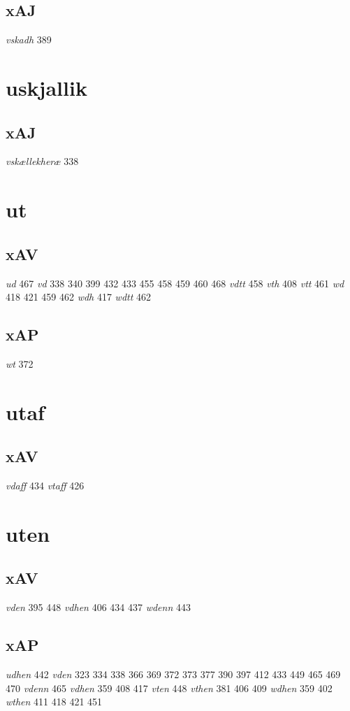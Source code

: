 \documentclass[a4paper,twocolumn]{article}
\begin{document}
\subsection{xAJ}
\label{sec:org82cc334}
\emph{vskadh} 389 
\section{uskjallik}
\label{sec:org17a98fa}
\subsection{xAJ}
\label{sec:org9221afd}
\emph{vskællekheræ} 338 
\section{ut}
\label{sec:org4f8ce6e}
\subsection{xAV}
\label{sec:org3da3f40}
\emph{ud} 467 \emph{vd} 338 340 399 432 433 455 458 459 460 468 \emph{vdtt} 458 \emph{vth} 408 \emph{vtt} 461 \emph{wd} 418 421 459 462 \emph{wdh} 417 \emph{wdtt} 462 
\subsection{xAP}
\label{sec:org1454486}
\emph{wt} 372 
\section{utaf}
\label{sec:org06c5d01}
\subsection{xAV}
\label{sec:org7ec5be6}
\emph{vdaff} 434 \emph{vtaff} 426 
\section{uten}
\label{sec:org518fedb}
\subsection{xAV}
\label{sec:org3b286ef}
\emph{vden} 395 448 \emph{vdhen} 406 434 437 \emph{wdenn} 443 
\subsection{xAP}
\label{sec:org9e7fd84}
\emph{udhen} 442 \emph{vden} 323 334 338 366 369 372 373 377 390 397 412 433 449 465 469 470 \emph{vdenn} 465 \emph{vdhen} 359 408 417 \emph{vten} 448 \emph{vthen} 381 406 409 \emph{wdhen} 359 402 \emph{wthen} 411 418 421 451 
\end{document}
